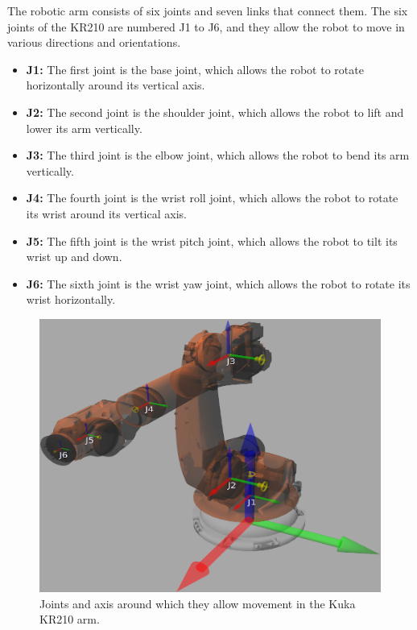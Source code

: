 \documentclass[12pt,oneside]{article}
\begin{document}
The robotic arm consists of six joints and seven links that connect them. The six joints of the KR210 are numbered J1 to J6, and they allow the robot to move in various directions and orientations.
\begin{itemize}
	\item \textbf{J1:} The first joint is the base joint, which allows the robot to rotate horizontally around its vertical axis.
	
	\item \textbf{J2:} The second joint is the shoulder joint, which allows the robot to lift and lower its arm vertically.
	
	\item \textbf{J3:} The third joint is the elbow joint, which allows the robot to bend its arm vertically.
	
	\item \textbf{J4:} The fourth joint is the wrist roll joint, which allows the robot to rotate its wrist around its vertical axis.
	
	\item \textbf{J5:} The fifth joint is the wrist pitch joint, which allows the robot to tilt its wrist up and down.
	
	\item \textbf{J6:} The sixth joint is the wrist yaw joint, which allows the robot to rotate its wrist horizontally.	 
\end{itemize}

\begin{figure}[H]
	\centering
	\includegraphics[width=0.9\linewidth]{kuka5}
	\caption[kuka kr210 joints]{Joints and axis around which they allow movement in the Kuka KR210 arm.}
	\label{fig:kuka5}
\end{figure}
\end{document}
